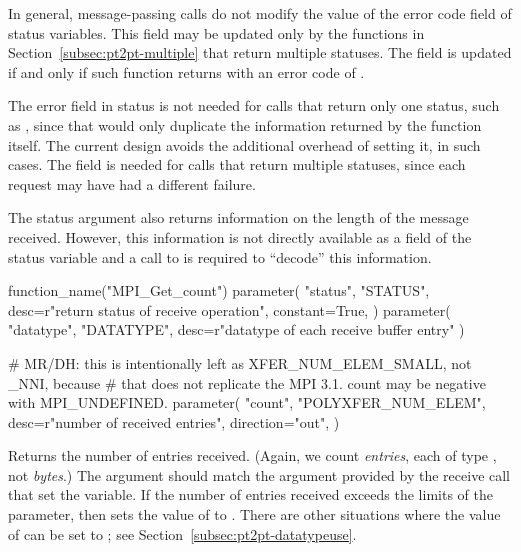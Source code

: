 In general, message-passing calls do not modify the value of the error
code field of status variables.  This field may be updated only by
the functions in Section~\ref{subsec:pt2pt-multiple} that return multiple
statuses.  The field is updated if and only if such function returns with
an error code of .

\begin{rationale}
The error field in status is not needed for calls that return only one
status, such as , since that would only duplicate the
information returned by the function itself.  The current design
avoids the additional overhead of setting it, in such cases.  The field
is needed for calls that return multiple statuses, since each request
may have had a different failure.
\end{rationale}

The status argument also returns information on the length of the message
received.  However, this information is not directly available as a field
of the status variable and a call to  is required
to ``decode'' this information.

\begin{mpi-binding}
    function_name("MPI_Get_count")
    parameter(
        "status",
        "STATUS",
        desc=r"return status of receive operation",
        constant=True,
    )
    parameter(
        "datatype", "DATATYPE", desc=r"datatype of each receive buffer entry"
    )

    # MR/DH: this is intentionally left as XFER_NUM_ELEM_SMALL, not _NNI, because
    # that does not replicate the MPI 3.1. count may be negative with MPI_UNDEFINED.
    parameter(
        "count",
        "POLYXFER_NUM_ELEM",
        desc=r"number of received entries",
        direction="out",
    )
\end{mpi-binding}

Returns the number of entries received.  (Again, we count \emph{entries}, each of
type , not \emph{bytes}.)
The  argument should match
the argument provided by the receive call that set the  variable.
If the number of entries received exceeds the limits of the 
parameter, then  sets the value of  to
.
There are other situations where the value of
 can be set to ; see Section~\ref{subsec:pt2pt-datatypeuse}.

